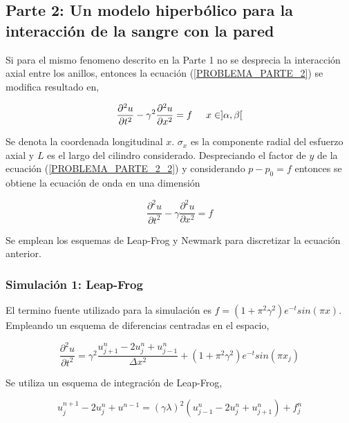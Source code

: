 
\subsection{Parte 2: Un modelo hiperbólico para la interacción de la sangre con la pared}

Si para el mismo fenomeno descrito en la Parte 1 no se desprecia la interacción axial entre los anillos, entonces la ecuación (\ref{PROBLEMA_PARTE_2}) se modifica resultado en,

\begin{equation} \label{PROBLEMA_PARTE_2_2}
\dfrac{\partial^2 u}{\partial t^2} - \gamma^2 \dfrac{\partial^2 u}{\partial x^2} = f \hspace{0,5cm} x \in ] \alpha , \beta [
\end{equation}

Se denota la coordenada longitudinal $x$. $\sigma_x$ es la componente radial del esfuerzo axial y $L$ es el largo del cilindro considerado. Despreciando el factor de $y$ de la ecuación (\ref{PROBLEMA_PARTE_2_2}) y considerando $p-p_0 = f$ entonces se obtiene la ecuación de onda en una dimensión

\begin{equation} \label{E_ONDA}
\dfrac{\partial^2 u}{\partial t^2} - \gamma \dfrac{\partial^2 u}{\partial x^2} = f
\end{equation}

Se emplean los esquemas de Leap-Frog y Newmark para discretizar la ecuación anterior.

\subsubsection{Simulación 1: Leap-Frog}

El termino fuente utilizado para la simulación es $ f = ( 1 + \pi^2 \gamma^2 ) e^{-t} sin( \pi x ) $. Empleando un esquema de diferencias centradas en el espacio,

\begin{equation}
\dfrac{ \partial^2 u }{ \partial t^2 } = \gamma^2 \dfrac{ u_{j+1}^n - 2 u_j^n + u_{j-1}^n }{ \Delta x ^2} + 
 ( 1 + \pi^2 \gamma^2 ) e^{-t} sin( \pi x_j ) 
\end{equation}

Se utiliza un esquema de integración de Leap-Frog,

\begin{equation}
u^{n+1}_j - 2u^n_j + u^{n-1} = (\gamma \lambda)^2 ( u^n_{j-1} -2 u^n_j + u^n_{j+1} ) + f^n_j
\end{equation}

